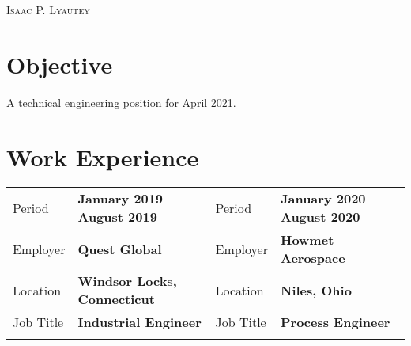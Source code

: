 \documentclass[a4paper, oneside, final, 10pt]{scrartcl} %
\newcommand{\gray}{\rowcolor[gray]{.90}} %
\begin{document}

\begin{center} %


{\fontsize{36}{36}\selectfont\scshape Isaac P. Lyautey}


\section{Objective}
\begin{center}
    A technical engineering position for April 2021.
\end{center}



\section{Work Experience}

\begin{tabularx}{0.97\linewidth}{XX|XX}
    \gray{}Period    & \textbf{January 2019 --- August 2019} & Period & \textbf{January 2020 --- August 2020}\\
    \gray{}Employer  & \textbf{Quest Global}                 & Employer & \textbf{Howmet Aerospace} \\
    \gray{}Location  & \textbf{Windsor Locks, Connecticut}   & Location & \textbf{Niles, Ohio}\\
    \gray{}Job Title & \textbf{Industrial Engineer}          & Job Title & \textbf{Process Engineer}\\
    \vspace{-10pt}
\end{tabularx}


\end{center}
\end{document}
